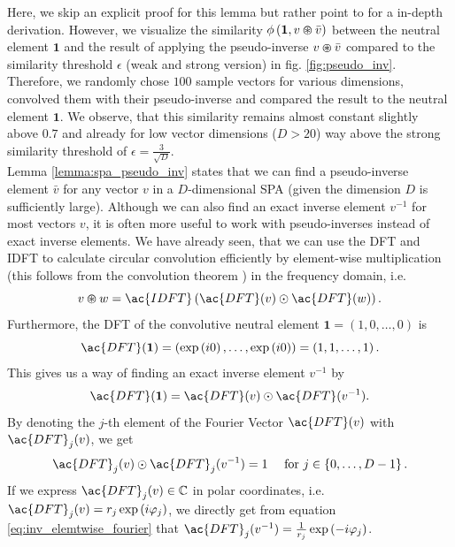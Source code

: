 Here, we skip an explicit proof for this lemma but rather point to \cite[Section 3.1.2 and 3.1.3]{Plate1994} for a in-depth derivation.
However, we visualize the similarity $\phi\left(\mathbf{1}, v \varoast \bar{v}\right)$ between the neutral element $\mathbf{1}$ and the result of applying the pseudo-inverse $v \varoast \bar{v}$ compared to the similarity threshold $\epsilon$ (weak and strong version) in fig. \ref{fig:pseudo_inv}.
Therefore, we randomly chose $100$ sample vectors for various dimensions, convolved them with their pseudo-inverse and compared the result to the neutral element $\mathbf{1}$.
We observe, that this similarity remains almost constant slightly above $0.7$ and already for low vector dimensions ($D > 20$) way above the strong similarity threshold of $\epsilon=\frac{3}{\sqrt{D}}$.\\
Lemma \ref{lemma:spa_pseudo_inv} states that we can find a pseudo-inverse element $\bar{v}$ for any vector $v$ in a $D$-dimensional \ac{SPA} (given the dimension $D$ is sufficiently large).
Although we can also find an exact inverse element $v^{-1}$ for most vectors $v$, it is often more useful to work with pseudo-inverses instead of exact inverse elements.
We have already seen, that we can use the \acf{DFT} and \acf{IDFT} to calculate circular convolution efficiently by element-wise multiplication (this follows from the convolution theorem \cite[Chap. 6]{Bracewell2000}) in the frequency domain, i.e.
\[
	v \varoast w = \ac{IDFT}\left(\ac{DFT}(v) \odot \ac{DFT}(w) \right).
\]
Furthermore, the \ac{DFT} of the convolutive neutral element $\mathbf{1} = \left(1, 0, \ldots, 0\right)$ is
\begin{equation}
	\ac{DFT}(\mathbf{1}) = \left(\exp\left(i0\right), \ldots, \exp\left(i0\right)\right) = \left(1, 1, \ldots, 1\right).
\end{equation}
This gives us a way of finding an exact inverse element $v^{-1}$ by
\begin{equation}
	\ac{DFT}(\mathbf{1}) = \ac{DFT}(v) \odot \ac{DFT}(v^{-1}).
\end{equation}
By denoting the $j$-th element of the Fourier Vector $\ac{DFT}(v)$ with $\ac{DFT}_{j}(v)$, we get
\begin{equation}
\label{eq:inv_elemtwise_fourier}
	\ac{DFT}_{j}(v) \odot \ac{DFT}_{j}(v^{-1}) = 1 \quad \textrm{ for } j \in \left\{0, \ldots, D-1\right\}.
\end{equation}
If we express $\ac{DFT}_{j}(v) \in \mathbb{C}$ in polar coordinates, i.e. $\ac{DFT}_{j}(v) = r_j \exp\left(i\varphi_j\right)$, we directly get from equation \ref{eq:inv_elemtwise_fourier} that $\ac{DFT}_{j}(v^{-1}) = \frac{1}{r_j} \exp\left(-i\varphi_j\right)$.
